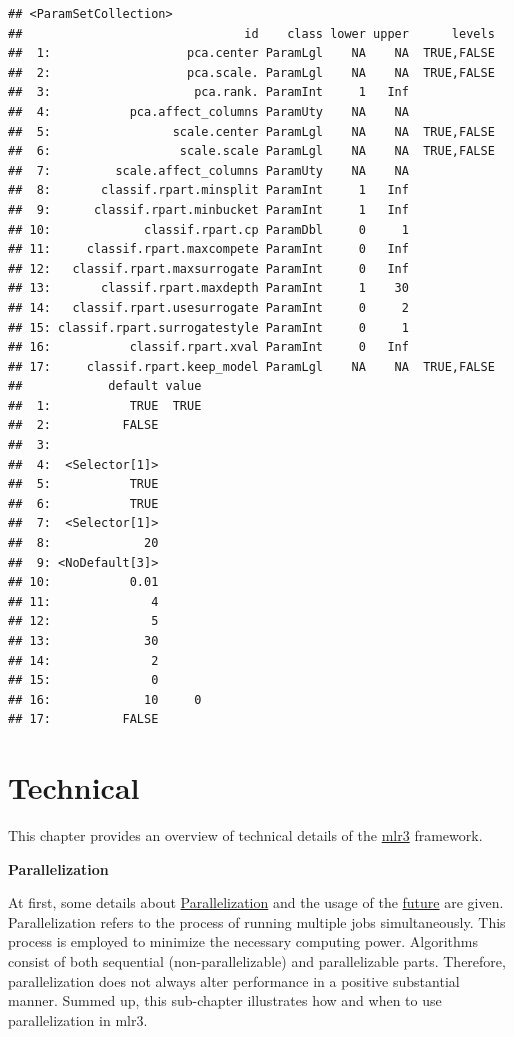 \documentclass[]{scrbook}
\begin{document}
\begin{verbatim}
## <ParamSetCollection>
##                               id    class lower upper      levels
##  1:                   pca.center ParamLgl    NA    NA  TRUE,FALSE
##  2:                   pca.scale. ParamLgl    NA    NA  TRUE,FALSE
##  3:                    pca.rank. ParamInt     1   Inf            
##  4:           pca.affect_columns ParamUty    NA    NA            
##  5:                 scale.center ParamLgl    NA    NA  TRUE,FALSE
##  6:                  scale.scale ParamLgl    NA    NA  TRUE,FALSE
##  7:         scale.affect_columns ParamUty    NA    NA            
##  8:       classif.rpart.minsplit ParamInt     1   Inf            
##  9:      classif.rpart.minbucket ParamInt     1   Inf            
## 10:             classif.rpart.cp ParamDbl     0     1            
## 11:     classif.rpart.maxcompete ParamInt     0   Inf            
## 12:   classif.rpart.maxsurrogate ParamInt     0   Inf            
## 13:       classif.rpart.maxdepth ParamInt     1    30            
## 14:   classif.rpart.usesurrogate ParamInt     0     2            
## 15: classif.rpart.surrogatestyle ParamInt     0     1            
## 16:           classif.rpart.xval ParamInt     0   Inf            
## 17:     classif.rpart.keep_model ParamLgl    NA    NA  TRUE,FALSE
##            default value
##  1:           TRUE  TRUE
##  2:          FALSE      
##  3:                     
##  4:  <Selector[1]>      
##  5:           TRUE      
##  6:           TRUE      
##  7:  <Selector[1]>      
##  8:             20      
##  9: <NoDefault[3]>      
## 10:           0.01      
## 11:              4      
## 12:              5      
## 13:             30      
## 14:              2      
## 15:              0      
## 16:             10     0
## 17:          FALSE
\end{verbatim}

\hypertarget{technical}{%
\chapter{Technical}\label{technical}}

This chapter provides an overview of technical details of the \href{https://mlr3.mlr-org.com}{mlr3} framework.

\textbf{Parallelization}

At first, some details about \protect\hyperlink{parallelization}{Parallelization} and the usage of the \href{https://cran.r-project.org/package=future}{future} are given.
Parallelization refers to the process of running multiple jobs simultaneously.
This process is employed to minimize the necessary computing power.
Algorithms consist of both sequential (non-parallelizable) and parallelizable parts.
Therefore, parallelization does not always alter performance in a positive substantial manner.
Summed up, this sub-chapter illustrates how and when to use parallelization in mlr3.
\end{document}
